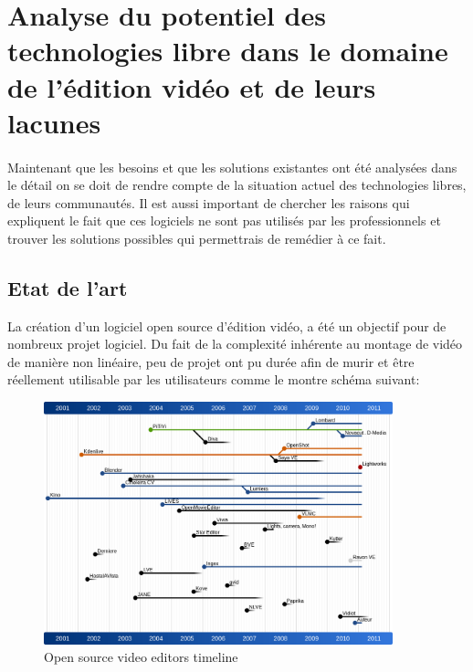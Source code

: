 \newpage
\section{Analyse du potentiel des technologies libre dans le domaine de l'édition
vidéo et de leurs lacunes}

\paragraph{}
    Maintenant que les besoins et que les solutions existantes ont été
    analysées dans le détail on se doit de rendre compte de la situation
    actuel des technologies libres, de leurs communautés. Il est aussi
    important de chercher les raisons qui expliquent le fait que ces
    logiciels ne sont pas utilisés par les professionnels et trouver
    les solutions possibles qui permettrais de remédier à ce fait.

  \subsection{Etat de l'art}
      La création d'un logiciel open source d'édition vidéo, a
      été un objectif pour de nombreux projet logiciel. Du fait de
      la complexité inhérente au montage de vidéo de manière non
      linéaire, peu de projet ont pu durée afin de murir et être
      réellement utilisable par les utilisateurs comme le montre schéma suivant:
      \begin{figure}[!htbp]
          \begin{center}
              \includegraphics[width=0.9\textwidth]{images/open-source-video-editor-timeline}
          \end{center}
          \caption{Open source video editors timeline}
          \label{Yes}
      \end{figure}


